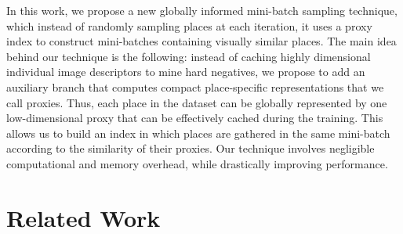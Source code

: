 \documentclass{bmvc2k}
\begin{document}
In this work, we propose a new globally informed mini-batch sampling technique, which instead of randomly sampling places at each iteration, it uses a proxy index to construct mini-batches containing visually similar places. The main idea behind our technique is the following: instead of caching highly dimensional individual image descriptors to mine hard negatives, we propose to add an auxiliary branch that computes compact place-specific representations that we call proxies. Thus, each place in the dataset can be globally represented by one low-dimensional proxy that can be effectively cached during the training. This allows us to build an index in which places are gathered in the same mini-batch according to the similarity of their proxies. Our technique involves negligible computational and memory overhead, while drastically improving performance.



\section{Related Work}
\label{sec:related}
\end{document}
